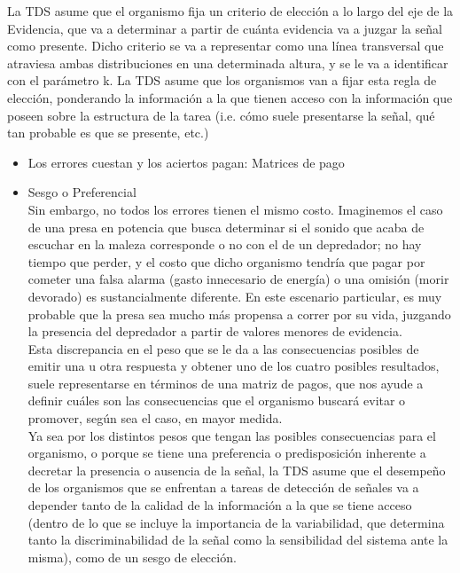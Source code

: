 \begin{itemize}
La TDS asume que el organismo fija un criterio de elección a lo largo del eje de la Evidencia, que va a determinar a partir de cuánta evidencia va a juzgar la señal como presente. Dicho criterio se va a representar como una línea transversal que atraviesa ambas distribuciones en una determinada altura, y se le va a identificar con el parámetro k. La TDS asume que los organismos van a fijar esta regla de elección, ponderando la información a la que tienen acceso con la información que poseen sobre la estructura de la tarea (i.e. cómo suele presentarse la señal, qué tan probable es que se presente, etc.)\\

    \begin{itemize}
      \item{Los errores cuestan y los aciertos pagan: Matrices de pago}\\

      \item{Sesgo o Preferencial}\\

 Sin embargo, no todos los errores tienen el mismo costo. Imaginemos el caso de una presa en potencia que busca determinar si el sonido que acaba de escuchar en la maleza corresponde o no con el de un depredador; no hay tiempo que perder, y el costo que dicho organismo tendría que pagar por cometer una falsa alarma (gasto innecesario de energía) o una omisión (morir devorado) es sustancialmente diferente. En este escenario particular, es muy probable que la presa sea mucho más propensa a correr por su vida, juzgando la presencia del depredador a partir de valores menores de evidencia.\\

Esta discrepancia en el peso que se le da a las consecuencias posibles de emitir una u otra respuesta y obtener uno de los cuatro posibles resultados, suele representarse en términos de una matriz de pagos, que nos ayude a definir cuáles son las consecuencias que el organismo buscará evitar o promover, según sea el caso, en mayor medida.\\

Ya sea por los distintos pesos que tengan las posibles consecuencias para el organismo, o porque se tiene una preferencia o predisposición inherente a decretar la presencia o ausencia de la señal, la TDS asume que el desempeño de los organismos que se enfrentan a tareas de detección de señales va a depender tanto de la calidad de la información a la que se tiene acceso (dentro de lo que se incluye la importancia de la variabilidad, que determina tanto la discriminabilidad de la señal como la sensibilidad del sistema ante la misma), como de un sesgo de elección.\\


\end{itemize}
\end{itemize}
